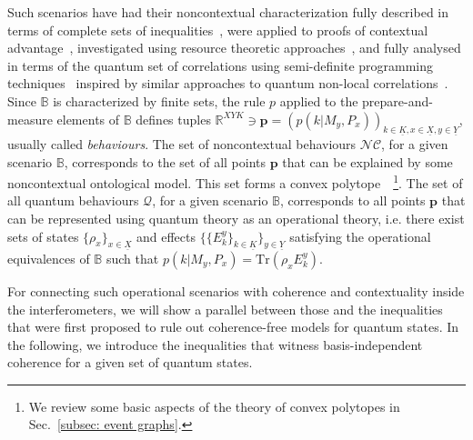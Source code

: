 \documentclass[a4paper,twocolumn,11pt,accepted=2024-01-17]{quantumarticle}
\begin{document}
Such scenarios have had their noncontextual characterization fully described in terms of complete sets of inequalities~\cite{schmid2018all}, were applied to proofs of contextual advantage~\cite{schmid2018discrimination,Lostaglio2020contextualadvantage,lostaglio_certifying_2020}, investigated using resource theoretic approaches~\cite{Duarte18,wagner2021using}, and fully analysed in terms of the quantum set of correlations using semi-definite programming techniques~\cite{chaturvedi2021characterising,tavakoli2021bounding} inspired by similar approaches to quantum non-local correlations~\cite{navascues2007bounding}. Since $\mathbb{B}$ is characterized by finite sets, the rule $p$ applied to the prepare-and-measure elements of $\mathbb{B}$ defines tuples $\mathbb{R}^{XYK} \ni \mathbf{p} = (p(k \vert M_y,P_x))_{k \in \underline{K}, x \in \underline{X}, y \in \underline{Y}}$, usually called \textit{behaviours}. The set of noncontextual behaviours $\mathcal{NC}$, for a given scenario $\mathbb{B}$, corresponds to the set of all points $\mathbf{p}$ that can be explained by some noncontextual ontological model. { This set forms a convex polytope~\cite{schmid2018all}~\footnote{{We review some basic aspects of the theory of convex polytopes in Sec.~\ref{subsec: event graphs}.}}.} The set of all quantum behaviours $\mathcal{Q}$, for a given scenario $\mathbb{B}$, corresponds to all points $\mathbf{p}$ that can be represented using quantum theory as an operational theory, i.e. there exist sets of states $\{\rho_x\}_{x \in \underline{X}}$ and effects $\{\{E_k^y\}_{k \in \underline{K}}\}_{y \in \underline{Y}}$ satisfying the operational equivalences of $\mathbb{B}$ such that $p(k \vert M_y,P_x) = \text{Tr}(\rho_x E_k^y)$. 

For connecting such operational scenarios with coherence and contextuality inside the interferometers, we will show a parallel between those and the inequalities that were first proposed to rule out coherence-free models for quantum states. In the following, we introduce the inequalities that witness basis-independent coherence for a given set of quantum states.
\end{document}

